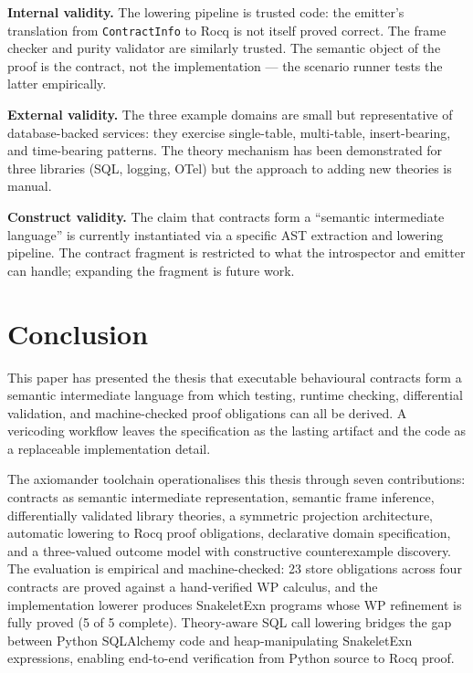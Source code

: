 \documentclass[11pt,a4paper]{article}
\begin{document}

\noindent\textbf{Internal validity.}
The lowering pipeline is trusted code: the emitter's translation from
\texttt{ContractInfo} to Rocq is not itself proved correct.  The frame
checker and purity validator are similarly trusted.  The semantic
object of the proof is the contract, not the implementation --- the
scenario runner tests the latter empirically.

\noindent\textbf{External validity.}
The three example domains are small but representative of
database-backed services: they exercise single-table, multi-table,
insert-bearing, and time-bearing patterns.  The theory mechanism has
been demonstrated for three libraries (SQL, logging, OTel) but the
approach to adding new theories is manual.

\noindent\textbf{Construct validity.}
The claim that contracts form a ``semantic intermediate language'' is
currently instantiated via a specific AST extraction and lowering
pipeline.  The contract fragment is restricted to what the introspector
and emitter can handle; expanding the fragment is future work.

\section{Conclusion}\label{sec:conclusion}

This paper has presented the thesis that executable behavioural
contracts form a semantic intermediate language from which testing,
runtime checking, differential validation, and machine-checked proof
obligations can all be derived.  A vericoding workflow leaves the
specification as the lasting artifact and the code as a replaceable
implementation detail.

The \textsf{axiomander} toolchain operationalises this thesis through
seven contributions: contracts as semantic intermediate representation,
semantic frame inference, differentially validated library theories, a
symmetric projection architecture, automatic lowering to Rocq proof
obligations, declarative domain specification, and a three-valued
outcome model with constructive counterexample discovery.  The
evaluation is empirical and machine-checked: 23 store obligations across four contracts are proved
against a hand-verified WP calculus, and the implementation lowerer
produces SnakeletExn programs whose WP refinement is fully proved
(5 of 5 complete).  Theory-aware SQL call lowering bridges the gap
between Python SQLAlchemy code and heap-manipulating SnakeletExn
expressions, enabling end-to-end verification from Python source to
Rocq proof.
\end{document}
